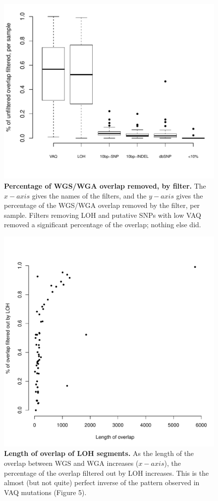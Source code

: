 \documentclass[11pt]{article} %
\begin{document}
\begin{figure}
\centerline{
\includegraphics[width=6in]{boxplot_percent_overlap_filtered.pdf} }
\caption{\textbf{Percentage of WGS/WGA overlap removed, by filter.} The $x-axis$ gives the names of the filters, and the $y-axis$ gives the percentage of the WGS/WGA overlap removed by the filter, per sample. Filters removing LOH and putative SNPs with low VAQ removed a significant percentage of the overlap; nothing else did.}
\end{figure}

\begin{figure}
\centerline{
\includegraphics[width=5in]{./LOH_VAQ/LOH_all.pdf} }
\caption{\textbf{Length of overlap of LOH segments.} As the length of the overlap between WGS and WGA increases ($x-axis$), the percentage of the overlap filtered out by LOH increases. This is the almost (but not quite) perfect inverse of the pattern observed in VAQ mutations (Figure 5).}
\end{figure}
\end{document}

